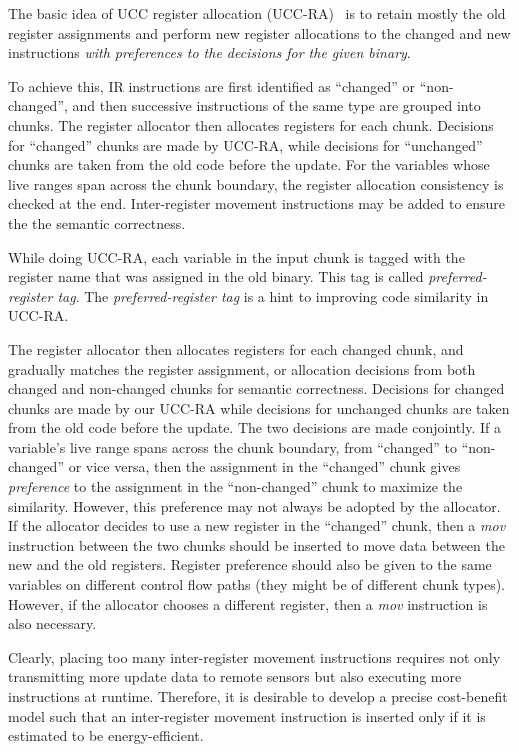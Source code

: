 The basic idea of UCC register allocation (UCC-RA)~\cite{ucc} is to retain mostly the old register assignments and 
perform new register allocations to the changed and new instructions {\em with preferences to the decisions for the 
given binary}. 

To achieve this, IR instructions are first identified as ``changed'' or ``non-changed'', and then successive 
instructions of the same type are grouped into chunks. The register allocator then allocates registers for each chunk.
Decisions for ``changed'' chunks are made by UCC-RA, while decisions for ``unchanged'' chunks are taken from the old 
code before the update. For the variables whose live ranges span across the chunk boundary, the register allocation 
consistency is checked at the end. Inter-register movement instructions may be added to ensure the the semantic 
correctness.

While doing UCC-RA, each variable in the input chunk is tagged with the register name that was assigned in the old 
binary. This tag is called {\em preferred-register tag}. The {\em preferred-register tag} is a hint to improving code 
similarity in UCC-RA.

The register allocator then allocates registers for each changed chunk, and gradually matches the register assignment, 
or allocation decisions from both changed and non-changed chunks for semantic correctness. Decisions for changed chunks 
are made by our UCC-RA while decisions for unchanged chunks are taken from the old code before the update. The two 
decisions are made conjointly. If a variable's live range spans across the chunk boundary, from ``changed'' to 
``non-changed'' or vice versa, then the assignment in the ``changed'' chunk gives {\em preference} to the assignment in 
the ``non-changed'' chunk to maximize the similarity. However, this preference may not always be adopted by the 
allocator. If the allocator decides to use a new register in the ``changed'' chunk, then a {\it mov} instruction 
between the two chunks should be inserted to move data between the new and the old registers. Register preference 
should also be given to the same variables on different control flow paths (they might be of different chunk types). 
However, if the allocator chooses a different register, then a {\it mov} instruction is also necessary.

Clearly, placing too many inter-register movement instructions requires not only transmitting more update data to 
remote sensors but also executing more instructions at runtime. Therefore, it is desirable to develop a precise 
cost-benefit model such that an inter-register movement instruction is inserted only if it is estimated to be 
energy-efficient.

